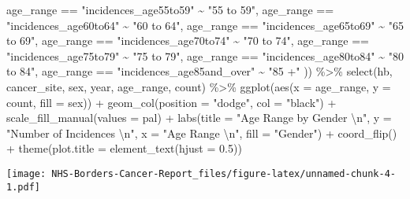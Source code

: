 \documentclass[
]{article}
\newenvironment{Shaded}{\begin{snugshade}}{\end{snugshade}}
\newcommand{\AttributeTok}[1]{\textcolor[rgb]{0.77,0.63,0.00}{#1}}
\newcommand{\FloatTok}[1]{\textcolor[rgb]{0.00,0.00,0.81}{#1}}
\newcommand{\FunctionTok}[1]{\textcolor[rgb]{0.00,0.00,0.00}{#1}}
\newcommand{\NormalTok}[1]{#1}
\newcommand{\SpecialCharTok}[1]{\textcolor[rgb]{0.00,0.00,0.00}{#1}}
\newcommand{\StringTok}[1]{\textcolor[rgb]{0.31,0.60,0.02}{#1}}
\begin{document}
\begin{Shaded}
\begin{Highlighting}[]
\NormalTok{    age\_range }\SpecialCharTok{==} \StringTok{"incidences\_age55to59"} \SpecialCharTok{\textasciitilde{}} \StringTok{"55 to 59"}\NormalTok{,}
\NormalTok{    age\_range }\SpecialCharTok{==} \StringTok{"incidences\_age60to64"} \SpecialCharTok{\textasciitilde{}} \StringTok{"60 to 64"}\NormalTok{,}
\NormalTok{    age\_range }\SpecialCharTok{==} \StringTok{"incidences\_age65to69"} \SpecialCharTok{\textasciitilde{}} \StringTok{"65 to 69"}\NormalTok{,}
\NormalTok{    age\_range }\SpecialCharTok{==} \StringTok{"incidences\_age70to74"} \SpecialCharTok{\textasciitilde{}} \StringTok{"70 to 74"}\NormalTok{,}
\NormalTok{    age\_range }\SpecialCharTok{==} \StringTok{"incidences\_age75to79"} \SpecialCharTok{\textasciitilde{}} \StringTok{"75 to 79"}\NormalTok{,}
\NormalTok{    age\_range }\SpecialCharTok{==} \StringTok{"incidences\_age80to84"} \SpecialCharTok{\textasciitilde{}} \StringTok{"80 to 84"}\NormalTok{,}
\NormalTok{    age\_range }\SpecialCharTok{==} \StringTok{"incidences\_age85and\_over"} \SpecialCharTok{\textasciitilde{}} \StringTok{"85 +"}
\NormalTok{  )) }\SpecialCharTok{\%\textgreater{}\%} 
  \FunctionTok{select}\NormalTok{(hb, cancer\_site, sex, year, age\_range, count) }\SpecialCharTok{\%\textgreater{}\%} 
  \FunctionTok{ggplot}\NormalTok{(}\FunctionTok{aes}\NormalTok{(}\AttributeTok{x =}\NormalTok{ age\_range, }\AttributeTok{y =}\NormalTok{ count, }\AttributeTok{fill =}\NormalTok{ sex)) }\SpecialCharTok{+}
  \FunctionTok{geom\_col}\NormalTok{(}\AttributeTok{position =} \StringTok{"dodge"}\NormalTok{, }\AttributeTok{col =} \StringTok{"black"}\NormalTok{) }\SpecialCharTok{+}
  \FunctionTok{scale\_fill\_manual}\NormalTok{(}\AttributeTok{values =}\NormalTok{ pal) }\SpecialCharTok{+}
  \FunctionTok{labs}\NormalTok{(}\AttributeTok{title =} \StringTok{"Age Range by Gender }\SpecialCharTok{\textbackslash{}n}\StringTok{"}\NormalTok{,}
       \AttributeTok{y =} \StringTok{"Number of Incidences }\SpecialCharTok{\textbackslash{}n}\StringTok{"}\NormalTok{,}
       \AttributeTok{x =} \StringTok{"Age Range }\SpecialCharTok{\textbackslash{}n}\StringTok{"}\NormalTok{,}
       \AttributeTok{fill =} \StringTok{"Gender"}\NormalTok{) }\SpecialCharTok{+}
  \FunctionTok{coord\_flip}\NormalTok{() }\SpecialCharTok{+}
  \FunctionTok{theme}\NormalTok{(}\AttributeTok{plot.title =} \FunctionTok{element\_text}\NormalTok{(}\AttributeTok{hjust =} \FloatTok{0.5}\NormalTok{))}
\end{Highlighting}
\end{Shaded}

\texttt{[image: NHS-Borders-Cancer-Report\_files/figure-latex/unnamed-chunk-4-1.pdf]}
\end{document}
